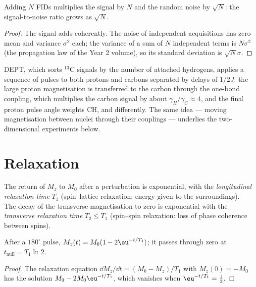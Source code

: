 \begin{proposition}\label{prop:b3:advanced-nmr:averaging}
Adding $N$ FIDs multiplies the signal by $N$ and the random noise by $\sqrt N$:
the signal-to-noise ratio grows as $\sqrt N$.
\end{proposition}

\begin{proof}
The signal adds coherently. The noise of independent acquisitions has zero
mean and variance $\sigma^2$ each; the variance of a sum of $N$ independent terms is
$N\sigma^2$ (the propagation law of the Year 2 volume), so its standard deviation
is $\sqrt N\sigma$.
\end{proof}

DEPT, which sorts ${}^{13}$C signals by the number of attached hydrogens,
applies a sequence of pulses to both protons and carbons separated by
delays of $1/2J$: the large proton magnetisation is transferred to the carbon
through the one-bond coupling, which multiplies the carbon signal by about
$\gamma_H/\gamma_C \approx 4$, and the final proton pulse angle weights CH,  and
 differently. The same idea --- moving magnetisation between nuclei
through their couplings --- underlies the two-dimensional experiments below.

\section{Relaxation}

\begin{definition}\label{def:b3:advanced-nmr:relaxation}
The return of $M_z$ to $M_0$ after a perturbation is exponential, with the
\emph{longitudinal relaxation time} $T_1$
(spin--lattice relaxation: energy given to the surroundings). The decay of
the transverse magnetisation to zero is exponential with the
\emph{transverse relaxation time} $T_2 \le T_1$
(spin--spin relaxation: loss of phase coherence between spins).
\end{definition}

\begin{proposition}\label{prop:b3:advanced-nmr:inversion-recovery}
After a $180^\circ$ pulse, $M_z(t) = M_0(1 - 2\eu^{-t/T_1})$; it passes through zero at
$t_{\mathrm{null}} = T_1\ln2$.
\end{proposition}

\begin{proof}
The relaxation equation $\dd M_z/\dd t = (M_0 - M_z)/T_1$ with $M_z(0) = -M_0$ has the
solution $M_0 - 2M_0\eu^{-t/T_1}$, which vanishes when $\eu^{-t/T_1} = \frac12$.
\end{proof}

